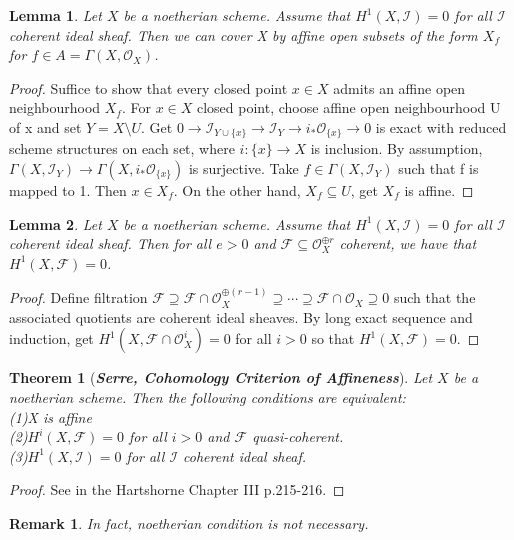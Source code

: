 \documentclass{ctexart}
\newtheorem{remark}{Remark}[section]
\newtheorem{theorem}{Theorem}[section]
\newtheorem{lemma}{Lemma}[section]
\begin{document}
\begin{lemma}
    Let $X$ be a noetherian scheme.
    Assume that $H^{1}(X, \mathcal{I}) = 0$ for all $\mathcal{I}$ coherent ideal sheaf.
    Then we can cover X by affine open subsets of the form $X_{f}$ for $f\in A = \Gamma(X, \mathcal{O}_{X})$.
    \label{Lemma 7.3}
\end{lemma}
\begin{proof}
    Suffice to show that every closed point $x\in X$ admits an affine open neighbourhood $X_{f}$.
    For $x\in X$ closed point, choose affine open neighbourhood U of x and set $Y = X \setminus U$.
    Get $0 \longrightarrow \mathcal{I}_{Y \cup \{x\}} \longrightarrow \mathcal{I}_{Y} \longrightarrow i_{\ast}\mathcal{O}_{\{x\}} \longrightarrow 0$  is exact with reduced scheme structures on each set,
    where $i: \{x\} \longrightarrow X$ is inclusion.
    By assumption, $\Gamma(X, \mathcal{I}_{Y}) \longrightarrow \Gamma(X, i_{\ast}\mathcal{O}_{\{x\}})$ is surjective.
    Take $f\in \Gamma(X, \mathcal{I}_{Y})$ such that f is mapped to 1.
    Then $x\in X_{f}$.
    On the other hand, $X_{f} \subseteq U$, get $X_{f}$ is affine.
\end{proof}
\begin{lemma}
    Let $X$ be a noetherian scheme.
    Assume that $H^{1}(X, \mathcal{I}) = 0$ for all $\mathcal{I}$ coherent ideal sheaf.
    Then for all $e > 0$ and $\mathcal{F} \subseteq \mathcal{O}_{X}^{\oplus r}$ coherent, we have that $H^{1}(X, \mathcal{F}) = 0$.
    \label{Lemma 7.4}
\end{lemma}
\begin{proof}
    Define filtration $\mathcal{F} \supseteq \mathcal{F} \cap \mathcal{O}_{X}^{\oplus (r - 1)} \supseteq \cdots \supseteq \mathcal{F} \cap \mathcal{O}_{X} \supseteq 0$ such that the associated quotients are coherent ideal sheaves.
    By long exact sequence and induction, get $H^{1}(X, \mathcal{F} \cap \mathcal{O}_{X}^{i}) = 0$ for all $i > 0$ so that $H^{1}(X, \mathcal{F}) = 0$.
\end{proof}
\begin{theorem}[\textbf{\emph{Serre, Cohomology Criterion of Affineness}}]
    Let $X$ be a noetherian scheme.
    Then the following conditions are equivalent: \\
    (1)X is affine \\
    (2)$H^{i}(X, \mathcal{F}) = 0$ for all $i > 0$ and $\mathcal{F}$ quasi-coherent. \\
    (3)$H^{1}(X, \mathcal{I}) = 0$ for all $\mathcal{I}$ coherent ideal sheaf.
    \label{Theorem 7.4}
\end{theorem}
\begin{proof}
    See in the Hartshorne Chapter III p.215-216.
\end{proof}
\begin{remark}
    In fact, noetherian condition is not necessary.
\end{remark}
\end{document}
